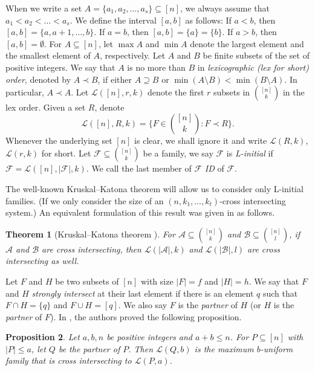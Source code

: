 \documentclass[a4paper,11pt]{article}
\newtheorem{theorem}{Theorem}[section]
\newtheorem{proposition}[theorem]{Proposition}
\begin{document}
When we write a set $A=\{a_1, a_2, \ldots, a_s\}\subseteq [n]$, we always assume that $a_1<a_2<\ldots<a_s$. We define the interval $[a, b]$ as follows:
 If $a< b$, then $[a, b]=\{a, a+1, \dots, b\}$.
If $a=b$, then $[a, b]=\{a\}=\{b\}$. If $a>b$, then $[a, b]=\emptyset$. For $A\subseteq [n]$, let $\max A$  and $\min A$ denote  the largest element and the smallest element of $A$, respectively.
 Let $A$ and $B$ be finite subsets of the set of positive integers. We say that $A$ is no more than $B$ in {\it lexicographic (lex for short) order}, denoted by $A\prec B$,
 if either $A\supseteq B$ or $\min(A\setminus B) < \min(B\setminus A)$. In particular, $A\prec A$. %
Let $\mathcal{L}([n], r, k)$ denote the first $r$ subsets in ${[n]\choose k}$ in the lex order. Given a set $R$, denote
\begin{equation}\label{NEW1}
\mathcal{L}([n], R, k)=\Big\{F\in {[n]\choose k}: F\prec R\Big\}.
\end{equation}
Whenever the underlying set $[n]$ is clear, we shall ignore it and write $\mathcal{L}(R, k)$, $\mathcal{L}(r, k)$ for short.  Let $\mathcal{F}\subseteq {[n]\choose k}$ be a family, we say $\mathcal{F}$ is {\it L-initial} if $\mathcal{F}=\mathcal{L}([n], |\mathcal{F}|, k)$. We call the last member of   $\mathcal{F}$ {\it ID} of $\mathcal{F}$.


The well-known Kruskal--Katona theorem \cite{KK1, KK2} will allow us to consider only L-initial families. (If we only consider the size of an $(n, k_1, \dots, k_t)$-cross intersecting system.) An equivalent formulation of this result was given in \cite{KK3, KK4} as follows.

\begin{theorem}[Kruskal--Katona theorem \cite{KK3, KK4}]\label{kk}
For $\mathcal{A}\subseteq {[n]\choose k}$ and $\mathcal{B}\subseteq {[n]\choose l}$, if $\mathcal{A}$ and $\mathcal{B}$ are cross intersecting, then $\mathcal{L}(|\mathcal{A}|, k)$ and $\mathcal{L}(|\mathcal{B}|, l)$ are cross intersecting as well.
\end{theorem}


Let $F$ and $H$ be two subsets of $[n]$ with size $|F|=f$ and $|H|=h$. We say that $F$ and $H$ {\it strongly intersect} at their last element if there is an element $q$ such that $F\cap H=\{q\}$ and $F\cup H=[q]$. We also say $F$ is the {\it partner} of $H$ (or $H$ is the {\it partner} of $F$).
In \cite{HP+}, the authors proved the following proposition.
\begin{proposition}\label{p2.7}
Let $a, b, n$ be positive integers and $a+b\leq n$. For $P\subseteq [n]$ with $|P|\leq a$, let $Q$ be the partner of $P$. Then $\mathcal{L}(Q, b)$ is the maximum  $b$-uniform family that is cross intersecting to $\mathcal{L}(P, a)$.
\end{proposition}
\end{document}
